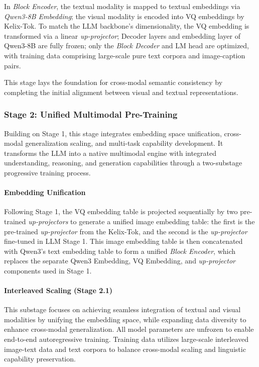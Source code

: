 \documentclass[11pt, a4paper, logo, copyright]{googledeepmind}
\begin{document}
In \textit{Block Encoder}, the textual modality is mapped to textual embeddings via \textit{Qwen3-8B Embedding}; the visual modality is encoded into VQ embeddings by Kelix-Tok. To match the LLM backbone’s dimensionality, the VQ embedding is transformed via a linear \textit{up-projector}; Decoder layers and embedding layer of Qwen3-8B are fully frozen; only the \textit{Block Decoder} and LM head are optimized, with training data comprising large-scale pure text corpora and image-caption pairs. %

This stage lays the foundation for cross-modal semantic consistency by completing the initial alignment between visual and textual representations.

\subsubsection{Stage 2: Unified Multimodal Pre-Training}
Building on Stage 1, this stage integrates embedding space unification, cross-modal generalization scaling, and multi-task capability development. It transforms the LLM into a native multimodal engine with integrated understanding, reasoning, and generation capabilities through a two-substage progressive training process.

\paragraph{Embedding Unification}
Following Stage 1, the VQ embedding table is projected sequentially by two pre-trained \textit{up-projectors} to generate a unified image embedding table: the first is the pre-trained \textit{up-projector} from the Kelix-Tok, and the second is the \textit{up-projector} fine-tuned in LLM Stage 1. This image embedding table is then concatenated with Qwen3’s text embedding table to form a unified \textit{Block Encoder}, which replaces the separate Qwen3 Embedding, VQ Embedding, and \textit{up-projector} components used in Stage 1. 

\paragraph{Interleaved Scaling (Stage 2.1)}
This substage focuses on achieving seamless integration of textual and visual modalities by unifying the embedding space, while expanding data diversity to enhance cross-modal generalization. All model parameters are unfrozen to enable end-to-end autoregressive training.
%
Training data utilizes large-scale interleaved image-text data and text corpora to balance cross-modal scaling and linguistic capability preservation.
\end{document}
